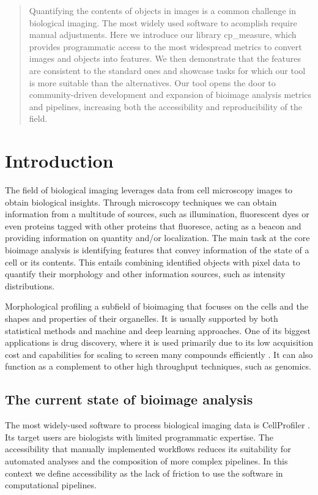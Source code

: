 \documentclass{article}
\begin{document}
\begin{abstract}
Quantifying the contents of objects in images is a common challenge in biological imaging. The most widely used software to acomplish require manual adjustments. Here we introduce our library cp\_measure, which provides programmatic access to the most widespread metrics to convert images and objects into features. We then demonstrate that the features are consistent to the standard ones and showcase tasks for which our tool is more suitable than the alternatives. Our tool opens the door to community-driven  development and expansion of bioimage analysis metrics and pipelines, increasing both the accessibility and reproducibility of the field.
\end{abstract}
\section{Introduction}
\label{sec:org6430daa}
The field of biological imaging leverages data from cell microscopy images to obtain biological insights. Through microscopy techniques we can obtain information from a multitude of sources, such as illumination, fluorescent dyes or even proteins tagged with other proteins that fluoresce, acting as a beacon and providing information on quantity and/or localization.
The main task at the core bioimage analysis is identifying features that convey information of the state of a cell or its contents. This entails combining identified objects with pixel data to quantify their morphology and other information sources, such as intensity distributions.

Morphological profiling a subfield of bioimaging that focuses on the cells and the shapes and properties of their organelles. It is usually supported by both statistical methods and machine and deep learning approaches. One of its biggest applications is drug discovery, where it is used primarily due to its low acquisition cost and capabilities for scaling to screen many compounds efficiently \citep{sealDecadeSystematicReview2024}. It can also function as a complement to other high throughput techniques, such as genomics.
\subsection{The current state of bioimage analysis}
\label{sec:org8f5b33d}
The most widely-used software to process biological imaging data is CellProfiler \citep{stirlingCellProfiler4Improvements2021}. Its target users are biologists with limited programmatic expertise. The accessibility that manually implemented workflows reduces its suitability for automated analyses and the composition of more complex pipelines. In this context we define accessibility as the lack of friction to use the software in computational pipelines.
\end{document}
